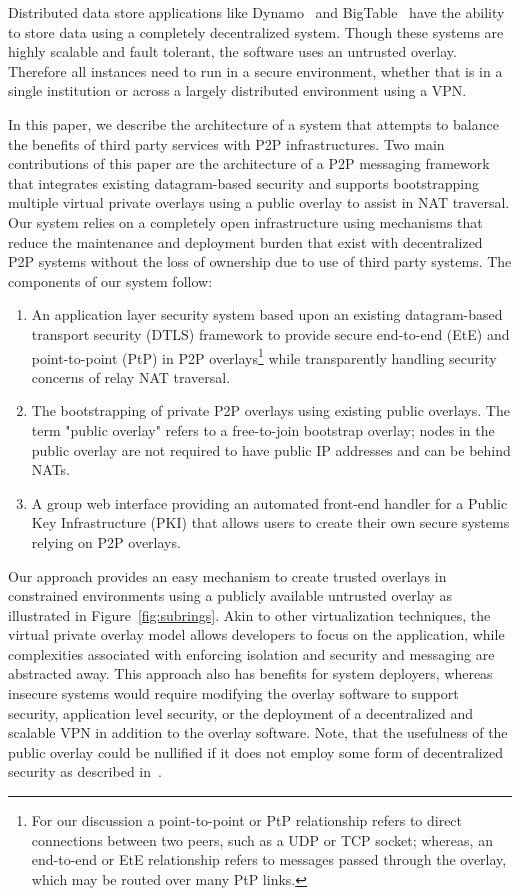 \documentclass[conference]{IEEEtran}
\begin{document}
Distributed data store applications like Dynamo~\cite{dynamo} and
BigTable~\cite{bigtable} have the ability to store data using a completely
decentralized system.  Though these systems are highly scalable and fault
tolerant, the software uses an untrusted overlay.  Therefore all instances
need to run in a secure environment, whether that is in a single institution
or across a largely distributed environment using a VPN.

In this paper, we describe the architecture of a system that attempts
to balance the benefits of third party services with P2P infrastructures.
Two main contributions of this paper are the architecture of a P2P messaging
framework that integrates existing datagram-based security and supports
bootstrapping multiple virtual private overlays using a public overlay to
assist in NAT traversal.
Our system relies on a completely open infrastructure using mechanisms that
reduce the maintenance and deployment burden that exist with decentralized
P2P systems without the loss of ownership due to use of third party systems.
The components of our system follow:
\begin{enumerate}
\setlength{\itemsep}{0pt}
\setlength{\parskip}{0pt}
\item An application layer security system based upon an existing datagram-based
transport security (DTLS) framework to provide secure end-to-end (EtE) and
point-to-point (PtP) in P2P overlays\footnote{For our discussion a point-to-point
or PtP relationship refers to direct connections between two peers, such as a UDP
or TCP socket; whereas, an end-to-end or EtE relationship refers to messages passed
through the overlay, which may be routed over many PtP links.}
 while transparently handling security
concerns of relay NAT traversal.
\item The bootstrapping of private P2P overlays using existing public overlays.
The term "public overlay" refers to a free-to-join bootstrap overlay; nodes in
the public overlay are not required to have public IP addresses and can be
behind NATs.
\item A group web interface providing an automated front-end handler for a 
Public Key Infrastructure (PKI) that allows users to create their own secure
systems relying on P2P overlays.
\end{enumerate}

Our approach provides an easy mechanism to create trusted overlays in
constrained environments using a publicly available untrusted overlay as
illustrated in Figure~\ref{fig:subrings}.  Akin to other virtualization
techniques, the virtual private overlay model allows developers to focus
on the application, while complexities associated with enforcing isolation
and security and messaging are abstracted away.
This approach also has benefits for system deployers, whereas insecure systems
would require modifying the overlay software to support security, application
level security, or the deployment of a decentralized and scalable VPN in
addition to the overlay software.  Note, that the usefulness of the public
overlay could be nullified if it does not employ some form of decentralized
security as described in~\cite{secure_routing}.
\end{document}
